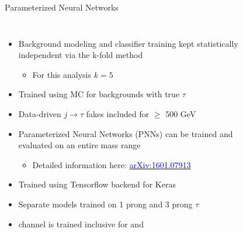 \documentclass[aspectratio=169,xcolor=table]{beamer}
\begin{document}
    \begin{frame}[t]{Parameterized Neural Networks}
      \begin{columns}
      \begin{itemize}
      \small
      \item Background modeling and classifier training kept statistically independent via the k-fold method
      \begin{itemize}
        \item For this analysis $k=5$
      \end{itemize}
      \item Trained using MC for backgrounds with true $\tau$
      \item Data-driven $j \rightarrow \tau$ fakes included for $\geq$ 500 GeV 
      \item Parameterized Neural Networks (PNNs) can be trained and evaluated on an entire mass range
      \begin{itemize}
        \item Detailed information here: \href{https://arxiv.org/abs/1601.07913}{\textcolor{blue}{arXiv:1601.07913}}
      \end{itemize}
      \item Trained using Tensorflow backend for Keras
      \item Separate models trained on 1 prong and 3 prong $\tau$
      \item \taulep channel is trained inclusive for \tauel and \taumu
      \end{itemize}
      \footnotesize
      \centering      
      \begin{figure}
        \centering
        \begin{columns}

\end{columns}
\end{figure}
\end{columns}
\end{frame}
\end{document}
